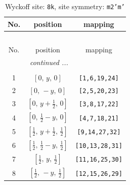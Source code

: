 \documentclass[fleqn,8pt]{jsarticle}
\begin{document}
\begin{longtable}{ccc}
\caption{Wyckoff site: {\tt 8k}, site symmetry: {\tt m2'm'}}
 \\
 \hline \hline
No. & position & mapping \\ \hline \endfirsthead

\multicolumn{2}{l}{\tablename\ \thetable{}} \\
 \hline \hline
No. & position & mapping \\ \hline \endhead

 \hline \hline
\multicolumn{2}{r}{\footnotesize\it continued ...} \\ \endfoot

 \hline \hline
\multicolumn{2}{r}{} \\ \endlastfoot

1 & $\left[ 0,\, y,\, 0 \right]$ & {\tt [1,6,19,24]} \\ \hline
2 & $\left[ 0,\, - y,\, 0 \right]$ & {\tt [2,5,20,23]} \\ \hline
3 & $\left[ 0,\, y + \frac{1}{2},\, 0 \right]$ & {\tt [3,8,17,22]} \\ \hline
4 & $\left[ 0,\, \frac{1}{2} - y,\, 0 \right]$ & {\tt [4,7,18,21]} \\ \hline
5 & $\left[ \frac{1}{2},\, y + \frac{1}{2},\, \frac{1}{2} \right]$ & {\tt [9,14,27,32]} \\ \hline
6 & $\left[ \frac{1}{2},\, \frac{1}{2} - y,\, \frac{1}{2} \right]$ & {\tt [10,13,28,31]} \\ \hline
7 & $\left[ \frac{1}{2},\, y,\, \frac{1}{2} \right]$ & {\tt [11,16,25,30]} \\ \hline
8 & $\left[ \frac{1}{2},\, - y,\, \frac{1}{2} \right]$ & {\tt [12,15,26,29]} \\
\end{longtable}
\renewcommand{\arraystretch}{1.2}
\end{document}
